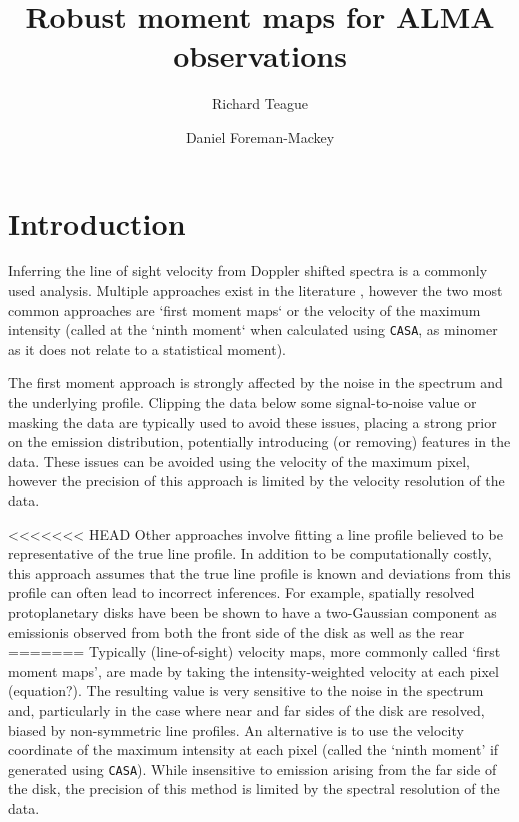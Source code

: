 \documentclass[rnaas]{aastex62}
\begin{document}
\raggedbottom\sloppy\sloppypar\frenchspacing

\title{%
Robust moment maps for ALMA observations
}

\author[0000-0003-1534-5186]{Richard Teague}

\author[0000-0002-9328-5652]{Daniel Foreman-Mackey}


\section{Introduction}

Inferring the line of sight velocity from Doppler shifted spectra is a commonly used analysis. Multiple approaches exist in the literature \citep[see, for example][]{deBlok:2008}, however the two most common approaches are `first moment maps` or the velocity of the maximum intensity (called at the `ninth moment` when calculated using \texttt{CASA}, as minomer as it does not relate to a statistical moment).

The first moment approach is strongly affected by the noise in the spectrum and the underlying profile. Clipping the data below some signal-to-noise value or masking the data are typically used to avoid these issues, placing a strong prior on the emission distribution, potentially introducing (or removing) features in the data. These issues can be avoided using the velocity of the maximum pixel, however the precision of this approach is limited by the velocity resolution of the data.

<<<<<<< HEAD
Other approaches involve fitting a line profile believed to be representative of the true line profile. In addition to be computationally costly, this approach assumes that the true line profile is known and deviations from this profile can often lead to incorrect inferences. For example, spatially resolved protoplanetary disks have been be shown to have a two-Gaussian component as emissionis observed from both the front side of the disk as well as the rear \citep{Rosenfeld:2013}
=======
Typically (line-of-sight) velocity maps, more commonly called `first moment maps', are made by taking the intensity-weighted velocity at each pixel (equation?). The resulting value is very sensitive to the noise in the spectrum and, particularly in the case where near and far sides of the disk are resolved, biased by non-symmetric line profiles. An alternative is to use the velocity coordinate of the maximum intensity at each pixel (called the `ninth moment' if generated using \texttt{CASA}). While insensitive to emission arising from the far side of the disk, the precision of this method is limited by the spectral resolution of the data.
\end{document}
